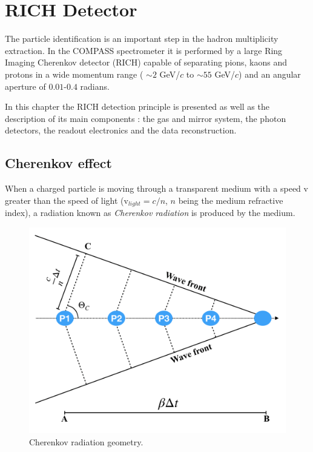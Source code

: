 
\chapter{RICH Detector}
\label{ch:RICH} %


The particle identification is an important step in the hadron multiplicity extraction. In the COMPASS spectrometer it is performed by a large Ring Imaging Cherenkov detector (RICH) capable of separating pions, kaons and protons in a wide momentum range ( $\sim$$2$ GeV/$c$ to $\sim$$55$ GeV/$c$) and an angular aperture of $0.01$-$0.4$ radians.

In this chapter the RICH detection principle is presented as well as the description of its main components : the gas and mirror system, the photon detectors, the readout electronics and the data reconstruction.

\section{Cherenkov effect}

When a charged particle is moving through a transparent medium with a speed v greater than the speed of light (v$_{light} = c/n$, $n$ being the medium refractive index), a radiation known as \textit{Cherenkov radiation} is produced by the medium.

\begin{figure}[!h]
  \centering
	\includegraphics[scale=0.5]{./gfx/CherenkovGeom.png}
	\caption{Cherenkov radiation geometry.}
	\label{pic:CherenkovGeom}
\end{figure}

